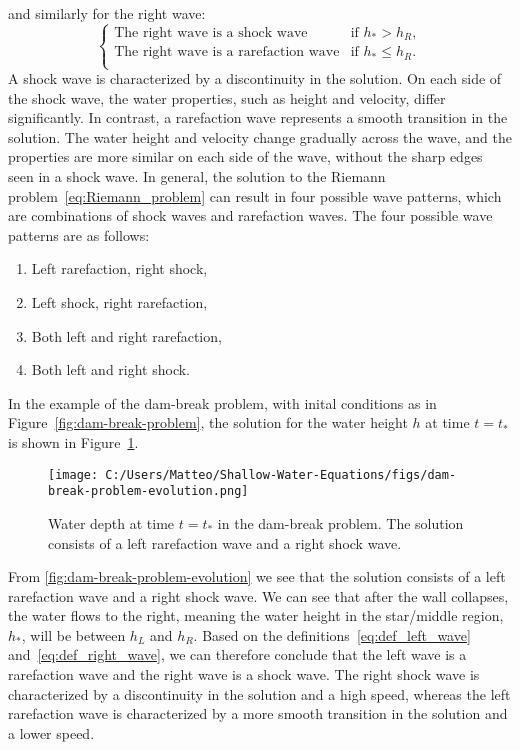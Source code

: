 and similarly for the right wave:
\begin{equation}\label{eq:def_right_wave}
    \begin{cases}
        \text{The right wave is a shock wave} & \text{if } h_* > h_R, \\
        \text{The right wave is a rarefaction wave} & \text{if } h_* \leq h_R. \\        
    \end{cases} 
\end{equation}
A shock wave is characterized by a discontinuity in the solution.
On each side of the shock wave, the water properties, such as height and velocity, differ significantly.
In contrast, a rarefaction wave represents a smooth transition in the solution.
The water height and velocity change gradually across the wave, and the properties are more similar on each side of the wave, without the sharp edges seen in a shock wave.
In general, the solution to the Riemann problem~\eqref{eq:Riemann_problem} can result in four possible wave patterns, which are combinations of shock waves and rarefaction waves.
The four possible wave patterns are as follows:
\begin{enumerate}[label= (\alph*)]
    \item Left rarefaction, right shock,
    \item Left shock, right rarefaction,
    \item Both left and right rarefaction,
    \item Both left and right shock.
\end{enumerate}
In the example of the dam-break problem, with inital conditions as in Figure~\ref{fig:dam-break-problem}, the solution for the water height $h$ at time $t = t_*$ is shown in Figure~\ref{fig:dam-break-problem-evolution}.
\begin{figure}[H]
    \centering
    \texttt{[image: C:/Users/Matteo/Shallow-Water-Equations/figs/dam-break-problem-evolution.png]}
    \caption{Water depth at time $t = t_*$ in the dam-break problem. The solution consists of a left rarefaction wave and a right shock wave.}\label{fig:dam-break-problem-evolution}
\end{figure}
From \autoref{fig:dam-break-problem-evolution} we see that the solution consists of a left rarefaction wave and a right shock wave.
We can see that after the wall collapses, the water flows to the right, meaning the water height in the star/middle region, $h_*$, will be between $h_L$ and $h_R$.
Based on the definitions~\eqref{eq:def_left_wave} and~\eqref{eq:def_right_wave}, we can therefore conclude that the left wave is a rarefaction wave and the right wave is a shock wave.
The right shock wave is characterized by a discontinuity in the solution and a high speed, whereas the left rarefaction wave is characterized by a more smooth transition in the solution and a lower speed.

